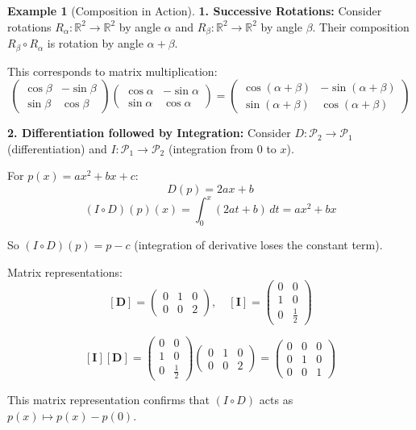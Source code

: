 \documentclass[12pt]{article}
\numberwithin{equation}{section}
\newcommand{\mat}[1]{\mathbf{#1}}        %
\theoremstyle{plain}
\theoremstyle{definition}
\newtheorem{example}[theorem]{Example}
\theoremstyle{remark}
\begin{document}
\begin{example}[Composition in Action]
\textbf{1. Successive Rotations:}
Consider rotations $R_\alpha: \mathbb{R}^2 \to \mathbb{R}^2$ by angle $\alpha$ and $R_\beta: \mathbb{R}^2 \to \mathbb{R}^2$ by angle $\beta$. Their composition $R_\beta \circ R_\alpha$ is rotation by angle $\alpha + \beta$.

This corresponds to matrix multiplication:
$$\begin{pmatrix} \cos\beta & -\sin\beta \\ \sin\beta & \cos\beta \end{pmatrix}\begin{pmatrix} \cos\alpha & -\sin\alpha \\ \sin\alpha & \cos\alpha \end{pmatrix} = \begin{pmatrix} \cos(\alpha+\beta) & -\sin(\alpha+\beta) \\ \sin(\alpha+\beta) & \cos(\alpha+\beta) \end{pmatrix}$$

\textbf{2. Differentiation followed by Integration:}
Consider $D: \mathcal{P}_2 \to \mathcal{P}_1$ (differentiation) and $I: \mathcal{P}_1 \to \mathcal{P}_2$ (integration from 0 to $x$).

For $p(x) = ax^2 + bx + c$:
$$D(p) = 2ax + b$$
$$(I \circ D)(p)(x) = \int_0^x (2at + b) \, dt = ax^2 + bx$$

So $(I \circ D)(p) = p - c$ (integration of derivative loses the constant term).

Matrix representations:
$$[\mat{D}] = \begin{pmatrix} 0 & 1 & 0 \\ 0 & 0 & 2 \end{pmatrix}, \quad [\mat{I}] = \begin{pmatrix} 0 & 0 \\ 1 & 0 \\ 0 & \frac{1}{2} \end{pmatrix}$$

$$[\mat{I}][\mat{D}] = \begin{pmatrix} 0 & 0 \\ 1 & 0 \\ 0 & \frac{1}{2} \end{pmatrix}\begin{pmatrix} 0 & 1 & 0 \\ 0 & 0 & 2 \end{pmatrix} = \begin{pmatrix} 0 & 0 & 0 \\ 0 & 1 & 0 \\ 0 & 0 & 1 \end{pmatrix}$$

This matrix representation confirms that $(I \circ D)$ acts as $p(x) \mapsto p(x) - p(0)$.
\end{example}
\end{document}
